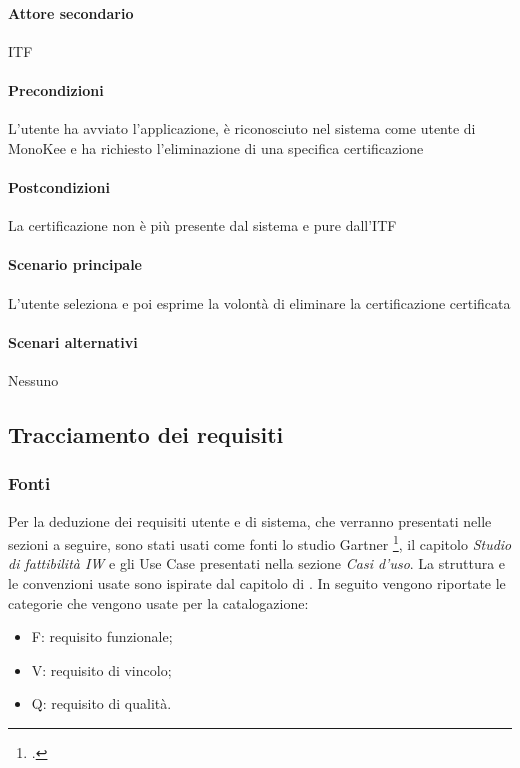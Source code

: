 \paragraph{Attore secondario}  ITF
\paragraph{Precondizioni} L’utente ha avviato l’applicazione, è riconosciuto nel sistema come utente di MonoKee e ha richiesto l’eliminazione di una specifica certificazione
\paragraph{Postcondizioni}  La certificazione non è più presente dal sistema e pure dall’ITF
\paragraph{Scenario principale}  
L’utente seleziona e poi esprime la volontà di eliminare la certificazione certificata
\paragraph{Scenari alternativi}  Nessuno

















\newpage
\subsection{Tracciamento dei requisiti}

\subsubsection{Fonti}
Per la deduzione dei requisiti utente e di sistema, che verranno presentati nelle sezioni a seguire, sono stati usati come fonti lo studio Gartner \footcite{farah:The-Dawn-of-Decentralized-Identity}, il capitolo \emph{Studio di fattibilità IW} e gli Use Case presentati nella sezione \emph{Casi d'uso}. La struttura e le convenzioni usate sono ispirate dal capitolo di \cite{som:swe}. In seguito vengono riportate le categorie che vengono usate per la catalogazione:
\begin{itemize}
    \item F: requisito funzionale;
    \item V: requisito di vincolo;
    \item Q: requisito di qualità.
\end{itemize}
    
